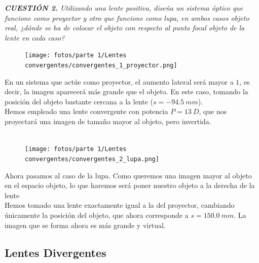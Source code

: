 \documentclass[11pt]{article}
\begin{document}
    \clearpage

    \noindent
    \textit{\textbf{CUESTIÓN 2.} Utilizando una lente positiva, diseña un sistema óptico que funcione como proyector y otro que funcione como lupa, en ambos casos objeto real, ¿dónde se ha de colocar el objeto con respecto al punto focal objeto de la lente en cada caso?}
    \\


   \begin{figure}
        \vspace{-0.55cm}
        \centering
        \texttt{[image: fotos/parte 1/Lentes convergentes/convergentes\_1\_proyector.png]}
        \label{fig:convergentes_2_proyector}
    \end{figure} 
    
    \noindent
    En un sistema que actúe como proyector, el aumento lateral será mayor a $1$, es decir, la imagen aparecerá más grande que el objeto. En este caso, tomando la posición del objeto bastante cercana a la lente ($s = -94.5\ mm$).\\
    
    \noindent Hemos empleado una lente convergente con potencia $P = 13\ D$, que nos proyectará una imagen de tamaño mayor al objeto, pero invertida.
    \hspace{0cm}\\\hspace{0cm}\\

    \begin{figure}
        \vspace{-0.55cm}
        \centering
        \texttt{[image: fotos/parte 1/Lentes convergentes/convergentes\_2\_lupa.png]}
        \label{fig:convergentes_2_lupa}
    \end{figure} 
    
    \noindent Ahora pasamos al caso de la lupa. Como queremos una imagen mayor al objeto en el espacio objeto, lo que haremos será poner nuestro objeto a la derecha de la lente\\

    \noindent Hemos tomado una lente exactamente igual a la del proyector, cambiando únicamente la posición del objeto, que ahora corresponde a $s = 150.0\ mm$. La imagen que se forma ahora es más grande y virtual.

    \clearpage
    \subsection{Lentes Divergentes}
\end{document}
